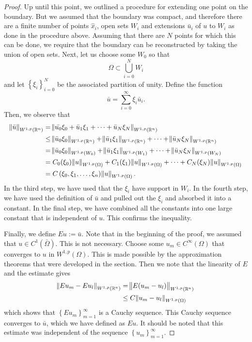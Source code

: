 \documentclass[10pt]{article}
\begin{document}
\begin{proof}
 	Up until this point, we outlined a procedure for extending one point on the boundary. But we assumed that the boundary was compact, and therefore there are a finite number of points $\hat{x}_i$, open sets $W_i$ and extensions $\bar{u}_i$ of $u$ to $W_i$ as done in the procedure above. Assuming that there are $N$ points for which this can be done, we require that the boundary can be reconstructed by taking the union of open sets. Next, let us choose some $W_0$ so that 
 	\begin{equation*}
 		\displaystyle \Omega \subset \bigcup\limits_{i=0}^{N}{W_i}
 	\end{equation*}
 	and let $\left\{ \xi_i \right\}_{i=0}^{N}$ be the associated partition of unity. Define the function 
 	\begin{equation*}
	 	\displaystyle \bar{u} = \sum\limits_{i=0}^{\infty}{\xi_i \bar{u}_i}. 
 	\end{equation*}
 	Then, we observe that
 	\begin{align*}
 		\displaystyle \norm{\bar{u}}_{W^{1,p}(\mathbb{R}^n)} &= \norm{\bar{u_0}\xi_0 + \bar{u}_1\xi_1 + \cdots + \bar{u}_N\xi_N}_{W^{1,p}(\mathbb{R}^n)} \\
 		&\leq \norm{\bar{u}_0\xi_0}_{W^{1,p}(\mathbb{R}^n)} + \norm{\bar{u}_1\xi_1}_{W^{1,p}(\mathbb{R}^n)} + \cdots + \norm{\bar{u}_N\xi_N}_{W^{1,p}(\mathbb{R}^n)} \\
 		&= \norm{\bar{u}_0\xi_0}_{W^{1,p}(W_0)} + \norm{\bar{u}_1\xi_1}_{W^{1,p}(W_1)} + \cdots + \norm{\bar{u}_N\xi_N}_{W^{1,p}(W_N)} \\
 		&= C_0(\xi_0)\norm{u}_{W^{1,p}(\Omega)} + C_1(\xi_1)\norm{u}_{W^{1,p}(\Omega)} + \cdots + C_N(\xi_N)\norm{u}_{W^{1,p}(\Omega)} \\
 		&= C\left( \xi_0,\xi_1,\dots,\xi_n \right)\norm{u}_{W^{1,p}(\Omega)}. 
 	\end{align*}
 	In the third step, we have used that the $\xi_i$ have support in $W_i$. In the fourth step, we have used the definition of $\bar{u}$ and pulled out the $\xi_i$ and absorbed it into a constant. In the final step, we have combined all the constants into one large constant that is independent of $u$. This confirms the inequality.
 	
 	Finally, we define $Eu := \bar{u}$. Note that in the beginning of the proof, we assumed that $u \in C^1(\bar{\Omega})$. This is not necessary. Choose some $u_m \in C^\infty(\Omega)$ that converges to $u$ in $W^{1,p}(\Omega)$. This is made possible by the approximation theorems that were developed in the section. Then we note that the linearity of $E$ and the estimate gives 
 	\begin{align*}
 		\displaystyle \norm{Eu_m - Eu_l}_{W^{1,p}(\mathbb{R}^n)} &= \norm{E(u_m - u_l)}_{W^{1,p}(\mathbb{R}^n)} \\
 		&\leq C\norm{u_m - u_l}_{W^{1,p}(\Omega)}
 	\end{align*}
 	which shows that $\left\{ Eu_m \right\}_{m = 1}^{\infty}$ is a Cauchy sequence. This Cauchy sequence converges to $\bar{u}$, which we have defined as $Eu$. It should be noted that this estimate was independent of the sequence $\left\{u_m \right\}_{m=1}^{\infty}$.
 	

\end{proof}
\end{document}
